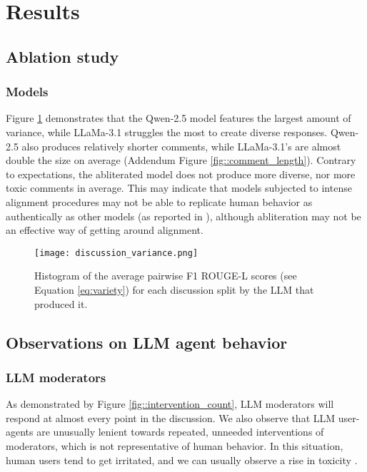%

\section{Results}

\subsection{Ablation study}

\subsubsection{Models}

Figure \ref{fig::discussion_variance} demonstrates that the Qwen-2.5 model features the largest amount of variance, while LLaMa-3.1 struggles the most to create diverse responses. Qwen-2.5 also produces relatively shorter comments, while LLaMa-3.1's are almost double the size on average (Addendum Figure \ref{fig::comment_length}). Contrary to expectations, the abliterated model does not produce more diverse, nor more toxic comments in average. This may indicate that models subjected to intense alignment procedures may not be able to replicate human behavior as authentically as other models (as reported in \citet{Park2023GenerativeAI}), although abliteration may not be an effective way of getting around alignment. 

\begin{figure}
	\centering
	\texttt{[image: discussion\_variance.png]}
	\caption{Histogram of the average pairwise F1 ROUGE-L scores (see Equation \ref{eq:variety}) for each discussion split by the \ac{LLM} that produced it.}
	\label{fig::discussion_variance}
\end{figure}


\subsection{Observations on LLM agent behavior}

\subsubsection{LLM moderators}

As demonstrated by Figure \ref{fig::intervention_count}, \ac{LLM} moderators will respond at almost every point in the discussion. We also observe that \ac{LLM} user-agents are unusually lenient towards repeated, unneeded interventions of moderators, which is not representative of human behavior. In this situation, human users tend to get irritated, and we can usually observe a rise in toxicity \cite{schaffner_community_guidelines, make_reddit_great, proactive_moderation, cresci_pesonalized_interventions}.

